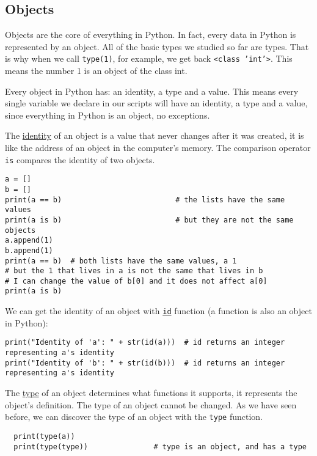 \documentclass[12pt, a4paper]{article}
\begin{document}
\subsection{Objects}
\label{sec:orgc7c4f34}
Objects are the core of everything in Python. In fact, every data in Python is represented by an object. All of the basic types we studied so far are types. That is why when we call \texttt{type(1)}, for example, we get back \texttt{<class 'int'>}. This means the number 1 is an object of the class int.

Every object in Python has: an identity, a type and a value.
This means every single variable we declare in our scripts will have an identity, a type and a value, since everything in Python is an object, no exceptions.

The \uline{identity} of an object is a value that never changes after it was created, it is like the address of an object in the computer's memory.
The comparison operator \texttt{is} compares the identity of two objects.
\lstset{language=jupyter-python,label= ,caption= ,captionpos=b,numbers=none}
\begin{lstlisting}
a = []
b = []
print(a == b)                          # the lists have the same values
print(a is b)                          # but they are not the same objects
a.append(1)
b.append(1)
print(a == b)  # both lists have the same values, a 1
# but the 1 that lives in a is not the same that lives in b
# I can change the value of b[0] and it does not affect a[0]
print(a is b)
\end{lstlisting}

We can get the identity of an object with \href{https://docs.python.org/3.6/library/functions.html?\#id}{\texttt{id}} function (a function is also an object in Python):
\lstset{language=jupyter-python,label= ,caption= ,captionpos=b,numbers=none}
\begin{lstlisting}
print("Identity of 'a': " + str(id(a)))  # id returns an integer representing a's identity
print("Identity of 'b': " + str(id(b)))  # id returns an integer representing a's identity
\end{lstlisting}

The \uline{type} of an object determines what functions it supports, it represents the object's definition. The type of an object cannot be changed. As we have seen before, we can discover the type of an object with the \texttt{type} function.
\lstset{language=Python,label= ,caption= ,captionpos=b,numbers=none}
\begin{lstlisting}
  print(type(a))
  print(type(type))               # type is an object, and has a type
\end{lstlisting}
\end{document}
